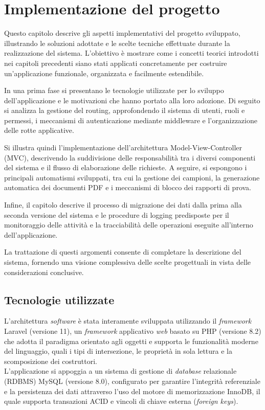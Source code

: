 \chapter{Implementazione del progetto}
\label{ch:implementazione}
Questo capitolo descrive gli aspetti implementativi del progetto sviluppato, illustrando le soluzioni adottate e le scelte tecniche effettuate durante la realizzazione del sistema. L'obiettivo è mostrare come i concetti teorici introdotti nei capitoli precedenti siano stati applicati concretamente per costruire un'applicazione funzionale, organizzata e facilmente estendibile.

In una prima fase si presentano le tecnologie utilizzate per lo sviluppo dell'applicazione e le motivazioni che hanno portato alla loro adozione. Di seguito si analizza la gestione del routing, approfondendo il sistema di utenti, ruoli e permessi, i meccanismi di autenticazione mediante middleware e l'organizzazione delle rotte applicative.

Si illustra quindi l'implementazione dell'architettura Model-View-Controller (MVC), descrivendo la suddivisione delle responsabilità tra i diversi componenti del sistema e il flusso di elaborazione delle richieste. A seguire, si espongono i principali automatismi sviluppati, tra cui la gestione dei campioni, la generazione automatica dei documenti PDF e i meccanismi di blocco dei rapporti di prova.

Infine, il capitolo descrive il processo di migrazione dei dati dalla prima alla seconda versione del sistema e le procedure di logging predisposte per il monitoraggio delle attività e la tracciabilità delle operazioni eseguite all'interno dell'applicazione.

La trattazione di questi argomenti consente di completare la descrizione del sistema, fornendo una visione complessiva delle scelte progettuali in vista delle considerazioni conclusive.
\section{Tecnologie utilizzate}
L'architettura \textit{software} è stata interamente sviluppata utilizzando il \textit{framework} Laravel (versione 11), un \textit{framework} applicativo \textit{web} basato su PHP (versione 8.2) che adotta il paradigma orientato agli oggetti e supporta le funzionalità moderne del linguaggio, quali i tipi di intersezione, le proprietà in sola lettura e la scomposizione dei costruttori.\\
L'applicazione si appoggia a un sistema di gestione di \textit{database} relazionale (RDBMS) MySQL (versione 8.0), configurato per garantire l'integrità referenziale e la persistenza dei dati attraverso l'uso del motore di memorizzazione InnoDB, il quale supporta transazioni ACID e vincoli di chiave esterna (\textit{foreign keys}).

